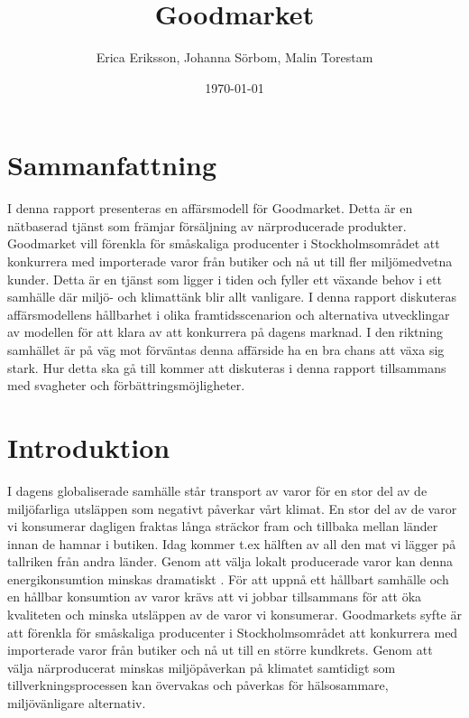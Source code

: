 \documentclass[10pt,a4paper,oneside]{article}
\title{Goodmarket}
\author{Erica Eriksson, Johanna Sörbom, Malin Torestam}
\date{\today}
\begin{document}
\maketitle
\newpage

\section{Sammanfattning}
I denna rapport presenteras en affärsmodell för Goodmarket. Detta är en nätbaserad tjänst som främjar försäljning av närproducerade produkter. Goodmarket vill förenkla för småskaliga producenter i Stockholmsområdet att konkurrera med importerade varor från butiker och nå ut till fler miljömedvetna kunder. Detta är en tjänst som ligger i tiden och fyller ett växande behov i ett samhälle där miljö- och klimattänk blir allt vanligare. I denna rapport diskuteras affärsmodellens hållbarhet i olika framtidsscenarion och alternativa utvecklingar av modellen för att klara av att konkurrera på dagens marknad. I den riktning samhället är på väg mot förväntas denna affärside ha en bra chans att växa sig stark. Hur detta ska gå till kommer att diskuteras i denna rapport tillsammans med svagheter och förbättringsmöjligheter. 
\newpage

\tableofcontents
\newpage

\section{Introduktion}
I dagens globaliserade samhälle står transport av varor för en stor del av de miljöfarliga utsläppen som negativt påverkar vårt klimat. En stor del av de varor vi konsumerar dagligen fraktas långa sträckor fram och tillbaka mellan länder innan de hamnar i butiken. Idag kommer t.ex hälften av all den mat vi lägger på tallriken från andra länder. Genom att välja lokalt producerade varor kan denna energikonsumtion minskas dramatiskt \cite{Naturskyddsföreningen2}. För att uppnå ett hållbart samhälle och en hållbar konsumtion av varor krävs att vi jobbar tillsammans för att öka kvaliteten och minska utsläppen av de varor vi konsumerar. Goodmarkets syfte är att förenkla för småskaliga producenter i Stockholmsområdet att konkurrera med importerade varor från butiker och nå ut till en större kundkrets. Genom att välja närproducerat minskas miljöpåverkan på klimatet samtidigt som tillverkningsprocessen kan övervakas och påverkas för hälsosammare, miljövänligare alternativ. 

\newpage
\end{document}
